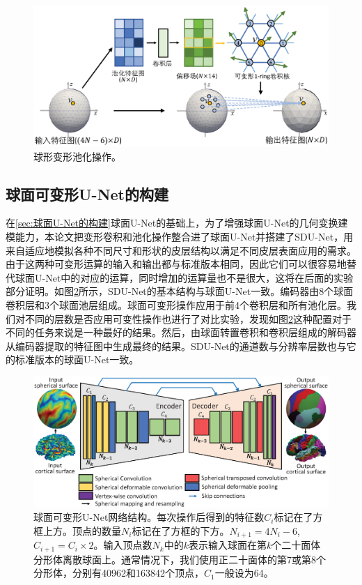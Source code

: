 \begin{figure}[t]
	\centering
	\includegraphics[width=0.85\linewidth]{figure/spheircal_deform_pool.eps}
	\caption{球形变形池化操作。}
	\label{fig:fig_deform_pool}
\end{figure}

\subsection{球面可变形U-Net的构建}
在\ref{sec:球面U-Net的构建}球面U-Net的基础上，为了增强球面U-Net的几何变换建模能力，本论文把变形卷积和池化操作整合进了球面U-Net并搭建了SDU-Net，用来自适应地模拟各种不同尺寸和形状的皮层结构以满足不同皮层表面应用的需求。由于这两种可变形运算的输入和输出都与标准版本相同，因此它们可以很容易地替代球面U-Net中的对应的运算，同时增加的运算量也不是很大，这将在后面的实验部分证明。如图\ref{fig:fig_sdunet}所示，SDU-Net的基本结构与球面U-Net一致。编码器由8个球面卷积层和3个球面池层组成。球面可变形操作应用于前4个卷积层和所有池化层。我们对不同的层数是否应用可变性操作也进行了对比实验，发现如图\ref{fig:fig_sdunet}这种配置对于不同的任务来说是一种最好的结果。然后，由球面转置卷积和卷积层组成的解码器从编码器提取的特征图中生成最终的结果。SDU-Net的通道数与分辨率层数也与它的标准版本的球面U-Net一致。

\begin{figure}[t]
	\centering
	\includegraphics[width=0.9\linewidth]{figure/spheircal_deform_cnn}
	\caption{球面可变形U-Net网络结构。每次操作后得到的特征数$C_i$标记在了方框上方。顶点的数量$N_i$标记在了方框的下方。$N_{i+1}=4N_i-6$, $C_{i+1}=C_i\times 2$。输入顶点数$N_k$中的$k$表示输入球面在第$k$个二十面体分形体离散球面上。通常情况下，我们使用正二十面体的第7或第8个分形体，分别有40962和163842个顶点，$C_1$一般设为64。}
	\label{fig:fig_sdunet}
\end{figure}



